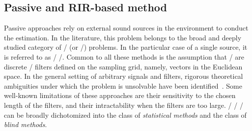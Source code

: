 \subsection{Passive and RIR-based method}\label{subsec:estimation:bce}
Passive approaches
rely on external sound sources in the environment to conduct the estimation.
In the literature, this problem belongs to the broad and deeply studied category of \BCEdef/ (or \BSIdef/) problems.
In the particular case of a single source, it is referred to as \SIMO/ \BCE/.
Common to all these methods is the assumption that \RIRs/ are discrete \FIR/ filters defined on the sampling grid, namely, vectors in the Euclidean space.
In the general setting of arbitrary signals and filters, rigorous theoretical ambiguities under which the problem is unsolvable have been identified~.
Some well-known limitations of these approaches are their sensitivity to the chosen length of the filters, and their intractability when the filters are too large.
\FIR/ \SIMO/ \BCE/ can be broadly dichotomized into the class of \textit{statistical methods} and the class of \textit{blind methods}.


